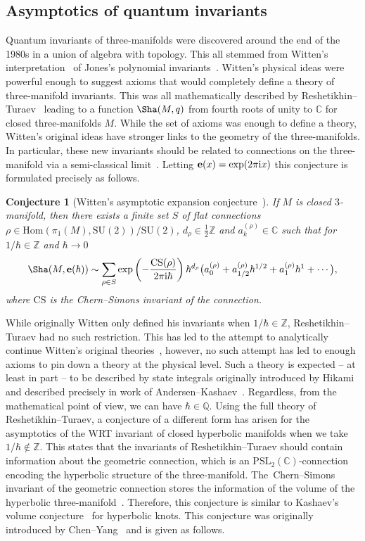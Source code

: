 \documentclass[pdftex]{sigma}
\numberwithin{equation}{section}
\newtheorem{Conjecture}[Theorem]{Conjecture}
\def\BZ{\mathbb{Z}}
\def\BQ{\mathbb{Q}}
\def\BC{\mathbb{C}}
\def\e{\mathbf e}
\def\PSL{\mathrm{PSL}}
\def\CS{\mathrm{CS}}
\def\SU{\mathrm{SU}}
\def\WRT{\Sha}
\def\BZ{\mathbb Z}
\def\BQ{\mathbb Q}
\def\BC{\mathbb C}
\def\PSL{\mathrm{PSL}}
\def\SU{\mathrm{SU}}
\begin{document}
\subsection{Asymptotics of quantum invariants}

Quantum invariants of three-manifolds were discovered around the end of the 1980s in a union of algebra with topology. This all stemmed from Witten's interpretation~\cite{Witten} of Jones's polynomial invariants~\cite{Jones,JonesII}. Witten's physical ideas were powerful enough to suggest axioms that would completely define a theory of three-manifold invariants. This was all mathematically described by Reshetikhin--Turaev~\cite{RT:rib,RT:3man} leading to a function $\WRT(M,q)$ from fourth roots of unity to $\BC$ for closed three-manifolds $M$. While the set of axioms was enough to define a theory, Witten's original ideas have stronger links to the geometry of the three-manifolds. In particular, these new invariants should be related to connections on the three-manifold via a semi-classical limit~\cite{Andersen:WAEC,Witten}. Letting $\e(x)=\exp(2\pi {\rm i}x)$ this conjecture is formulated precisely as follows.
\begin{Conjecture}[Witten's asymptotic expansion conjecture~\cite{Witten}]%
If $M$ is closed $3$-manifold, then there exists a finite set $S$ of flat connections $\rho\in\mathrm{Hom}(\pi_{1}(M),\SU(2))/\SU(2)$, $d_{\rho}\in\frac{1}{2}\BZ$ and $a^{(\rho)}_k\in\BC$ such that for $1/\hbar\in\BZ$ and $\hbar\rightarrow0$
\[
 \WRT(M,\e(\hbar))
 \sim
 \sum_{\rho\in S}\exp\left(-\frac{\CS(\rho)}{2\pi {\rm i}\hbar}\right)\hbar^{d_\rho}\bigl(a_0^{(\rho)}+a_{1/2}^{(\rho)}\hbar^{1/2}+a_{1}^{(\rho)}\hbar^{1}+\cdots\bigr) ,
\]
where $\CS$ is the Chern--Simons invariant of the connection.
\end{Conjecture}
While originally Witten only defined his invariants when $1/\hbar\in\BZ$, Reshetikhin--Turaev had no such restriction. This has led to the attempt to analytically continue Witten's original theories~\cite{Gukov,Witten:ancon}, however, no such attempt has led to enough axioms to pin down a theory at the physical level. Such a theory is expected -- at least in part -- to be described by state integrals originally introduced by Hikami~\cite{Dimofte,DGLZ,Hikami:stateint} and described precisely in work of Andersen--Kashaev~\cite{AK:II,AK:I,AK:III}. Regardless, from the mathematical point of view, we can have $\hbar\in\BQ$. Using the full theory of Reshetikhin--Turaev, a conjecture of a different form has arisen for the asymptotics of the WRT invariant of closed hyperbolic manifolds when we take $1/\hbar\notin\BZ$. This states that the invariants of Reshetikhin--Turaev should contain information about the geometric connection, which is an $\PSL_{2}(\BC)$-connection encoding the hyperbolic structure of the three-manifold. The~Chern--Simons invariant of the geometric connection stores the information of the volume of the hyperbolic three-manifold~\cite{Neu:Ext,NeuZag,Thurston:8geo,Yoshida:eta}. Therefore, this conjecture is similar to Kashaev's volume conjecture~\cite{Kashaev:VC,Murakami2} for hyperbolic knots. This conjecture was originally introduced by Chen--Yang~\cite{ChenYang} and is given as follows.
\end{document}
